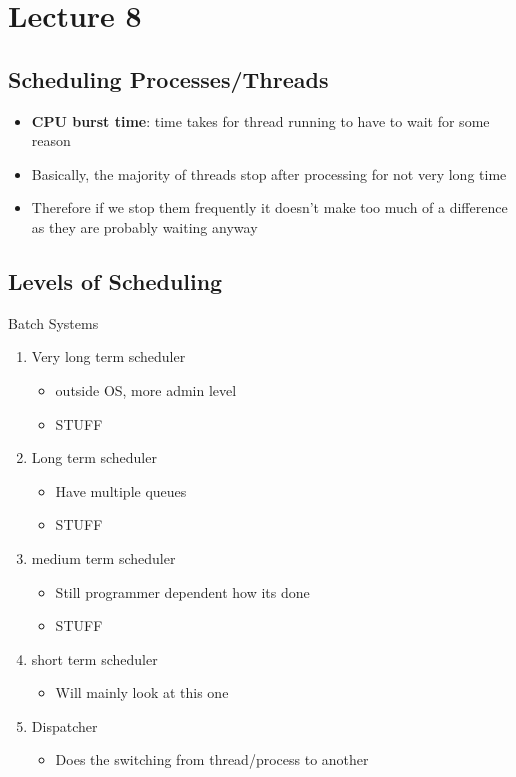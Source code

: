\documentclass{article}
\begin{document}
\section{Lecture 8}
	\subsection{Scheduling Processes/Threads}
		\begin{itemize}
			\item \textbf{CPU burst time}: time takes for thread running to have to wait for some reason
			\item Basically, the majority of threads stop after processing for not very long time
			\item Therefore if we stop them frequently it doesn't make too much of a difference as they are probably waiting anyway

		\end{itemize}
	
	\subsection{Levels of Scheduling}
		Batch Systems
		\begin{enumerate}
			\item Very long term scheduler
			\begin{itemize}
				\item outside OS, more admin level
				\item STUFF
			\end{itemize}

			\item Long term scheduler
			\begin{itemize}
				\item Have multiple queues
				\item STUFF
			\end{itemize}

			\item medium term scheduler
			\begin{itemize}
				\item Still programmer dependent how its done
				\item STUFF
			\end{itemize}

			\item short term scheduler
			\begin{itemize}
				\item Will mainly look at this one
			\end{itemize}

			\item Dispatcher
			\begin{itemize}
				\item Does the switching from thread/process to another
			\end{itemize}
		\end{enumerate}
			
\end{document}
